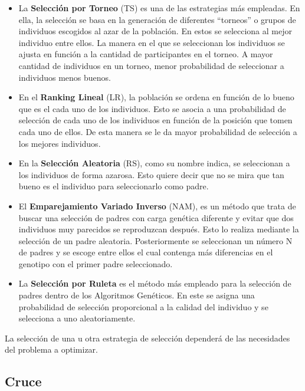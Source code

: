 \begin{itemize}
    \item La \textbf{Selección por Torneo} (TS) es una de las estrategias más empleadas. En ella, la selección se basa en la generación de diferentes ``torneos'' o grupos de individuos escogidos al azar de la población. En estos se selecciona al mejor individuo entre ellos. La manera en el que se seleccionan los individuos se ajusta en función a la cantidad de participantes en el torneo. A mayor cantidad de individuos en un torneo, menor probabilidad de seleccionar a individuos menos buenos.
    
    \item En el \textbf{Ranking Lineal} (LR), la población se ordena en función de lo bueno que es el cada uno de los individuos. Esto se asocia a una probabilidad de selección de cada uno de los individuos en función de la posición que tomen cada uno de ellos. De esta manera se le da mayor probabilidad de selección a los mejores individuos.
    
    \item En la \textbf{Selección Aleatoria} (RS), como su nombre indica, se seleccionan a los individuos de forma azarosa. Esto quiere decir que no se mira que tan bueno es el individuo para seleccionarlo como padre.
    
    \item El \textbf{Emparejamiento Variado Inverso} (NAM), es un método que trata de buscar una selección de padres con carga genética diferente y evitar que dos individuos muy parecidos se reproduzcan después. Esto lo realiza mediante la selección de un padre aleatoria. Posteriormente se seleccionan un número N de padres y se escoge entre ellos el cual contenga más diferencias en el genotipo con el primer padre seleccionado.
    
    \item La \textbf{Selección por Ruleta} es el método más empleado para la selección de padres dentro de los Algoritmos Genéticos. En este se asigna una probabilidad de selección proporcional a la calidad del individuo y se selecciona a uno aleatoriamente.
    
\end{itemize}

La selección de una u otra estrategia de selección dependerá de las necesidades del problema a optimizar.


\subsection{Cruce}

